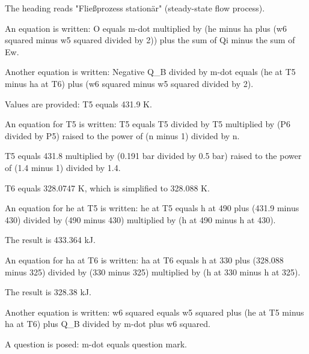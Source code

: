 The heading reads "Fließprozess stationär" (steady-state flow process).  

An equation is written:  
O equals m-dot multiplied by (he minus ha plus (w6 squared minus w5 squared divided by 2)) plus the sum of Qi minus the sum of Ew.  

Another equation is written:  
Negative Q_B divided by m-dot equals (he at T5 minus ha at T6) plus (w6 squared minus w5 squared divided by 2).  

Values are provided:  
T5 equals 431.9 K.  

An equation for T5 is written:  
T5 equals T5 divided by T5 multiplied by (P6 divided by P5) raised to the power of (n minus 1) divided by n.  

T5 equals 431.8 multiplied by (0.191 bar divided by 0.5 bar) raised to the power of (1.4 minus 1) divided by 1.4.  

T6 equals 328.0747 K, which is simplified to 328.088 K.  

An equation for he at T5 is written:  
he at T5 equals h at 490 plus (431.9 minus 430) divided by (490 minus 430) multiplied by (h at 490 minus h at 430).  

The result is 433.364 kJ.  

An equation for ha at T6 is written:  
ha at T6 equals h at 330 plus (328.088 minus 325) divided by (330 minus 325) multiplied by (h at 330 minus h at 325).  

The result is 328.38 kJ.  

Another equation is written:  
w6 squared equals w5 squared plus (he at T5 minus ha at T6) plus Q_B divided by m-dot plus w6 squared.  

A question is posed:  
m-dot equals question mark.